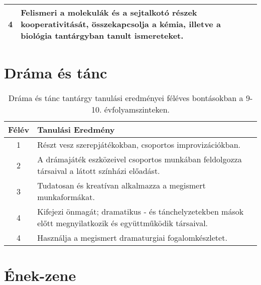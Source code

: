 \begin{longtable}{c | p{} }
                                
                                          4 &  Felismeri a molekulák és a sejtalkotó részek kooperativitását, összekapcsolja  a kémia, illetve a biológia tantárgyban tanult ismereteket. \\ \hline
                                      
                        \end{longtable}
            \clearpage

        \section{Dráma és tánc}

       
           \begin{longtable}{c | p{} }
            \caption[Dráma és tánc 9-10.]{Dráma és tánc tantárgy tanulási eredményei féléves bontásokban a 9-10. évfolyamszinteken. }  \\

            \textbf{Félév} & \textbf{Tanulási Eredmény} \\
            \hline
            \endhead
                                
                                          1 &  Részt vesz szerepjátékokban, csoportos improvizációkban. \\ \hline
                                          2 &  A drámajáték eszközeivel csoportos munkában feldolgozza társaival a látott színházi előadást. \\ \hline
                                      
                                
                                          3 &  Tudatosan és kreatívan alkalmazza a megismert munkaformákat. \\ \hline
                                      
                                
                                          4 &  Kifejezi önmagát; dramatikus - és tánchelyzetekben mások előtt megnyilatkozik és együttműködik társaival. \\ \hline
                                          4 &  Használja a megismert dramaturgiai fogalomkészletet. \\ \hline
                                      
                        \end{longtable}
            \clearpage

        \section{Ének-zene}

